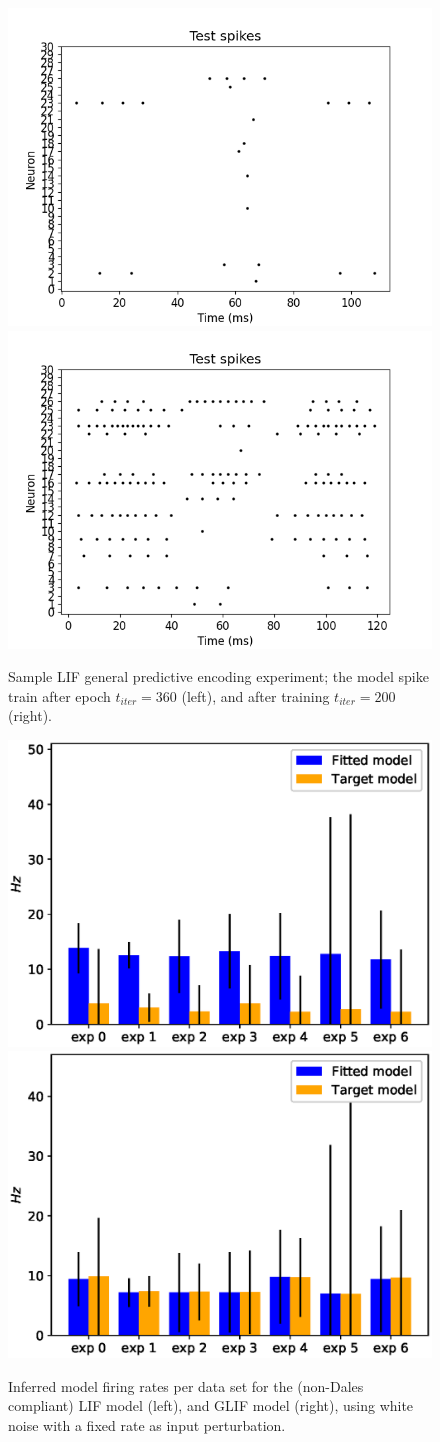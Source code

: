 \documentclass[mphil,deptreport,ianc]{infthesis} %
\begin{document}
\begin{figure}
    \centering
    \includegraphics[width=0.49\columnwidth]{figures/Supplementary/gating/LIF/GeneralPredictiveEncoding/01-04_16-46-28-427/test_plot_spikes_train_iter_60_LIF_27.png}
    \includegraphics[width=0.49\columnwidth]{figures/Supplementary/gating/LIF/GeneralPredictiveEncoding/01-04_16-46-28-427/test_plot_spikes_train_iter_199_LIF_27.png}
    
    \caption{Sample LIF general predictive encoding experiment; the model spike train after epoch $t_{iter}=360$ (left), and after training $t_{iter}=200$ (right).}
    \label{fig:LIF_GPE_1_readouts_t_i_30_and_80}
\end{figure}

\FloatBarrier
\begin{figure}
    \centering
    \includegraphics[width=0.49\columnwidth]{figures/sleep/approx_rate_across_exp_LIF_no_cell_types_frd_vs_fitted.eps}
    \includegraphics[width=0.49\columnwidth]{figures/sleep/approx_rate_across_exp_GLIF_no_cell_types_frd_vs_fitted.eps}
    \caption{Inferred model firing rates per data set for the (non-Dales compliant) LIF model (left), and GLIF model (right), using white noise with a fixed rate as input perturbation.}
    \label{fig:approx_rates_sleep_exps_LIF}
\end{figure}
\end{document}
